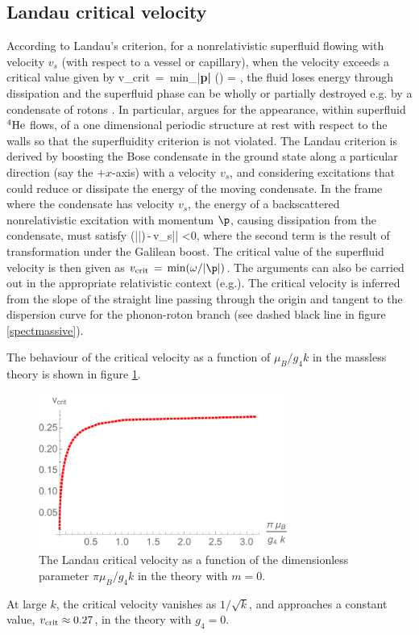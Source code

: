 \subsection{Landau critical velocity}
According to Landau's criterion, for a nonrelativistic superfluid flowing with velocity $v_s$ (with respect to a vessel or capillary), when the velocity exceeds a critical value \cite{schmitt} given by 
\be
v_{\rm crit} \,=\, {\rm min}_{|\bf p|} \left(\frac{\omega(\p)}{|\p|}\right)\,\implies \frac{\partial \omega}{\partial |\p|}\,=\,\frac{\omega}{|\p|}\,,
\ee
the fluid loses energy through dissipation and the superfluid phase can be wholly or partially destroyed e.g. by a condensate of rotons \cite{pitaevskii84, voskresenskii93}. In particular, \cite{pitaevskii84} argues for the appearance, within superfluid ${}^4{\rm He}$ flows, of a one dimensional periodic structure at rest with  respect to the walls so that the superfluidity criterion is not violated. The Landau criterion is derived by boosting the Bose condensate in the ground state along a particular direction (say the $+x$-axis) with a velocity $v_s$, and considering excitations that could reduce or dissipate the energy of the moving condensate. In the frame where the condensate has velocity $v_s$, the energy of a backscattered nonrelativistic excitation with momentum $\p$, causing dissipation  from the condensate, must  satisfy
\be
\omega(|\p|)\,-\,v_s|\p| <0,
\ee
where the second term is the result of  transformation under  the Galilean boost.
The critical value of the superfluid velocity is then given as $v_{\rm crit}\,=\,{\rm min}(\omega/|\p|)$. The arguments can also be carried out in the appropriate relativistic context (e.g.\cite{voskresenskii93, schmitt}). The critical velocity is inferred from the slope of the straight line passing through the origin and tangent to the dispersion curve for the phonon-roton branch (see dashed black line in figure \ref{spectmassive}).

 The behaviour of the critical velocity as a function of $\mu_B/g_4 k$ in the massless theory is shown in figure \ref{vcrit}.
 \begin{figure}[h]
\begin{center}
\includegraphics[height=2.0in]{Chapter_3_Folder_1806.06976/figures/vcrit.pdf}
\end{center}
\caption{ \small{The Landau critical velocity as a function of the dimensionless parameter $\pi\mu_B/g_4 k$ in the theory with $m=0$.}}
\label{vcrit}
\end{figure}
 At large $k$, the critical velocity vanishes as $1/\sqrt{k}$, and approaches a constant value, $v_{\rm crit}\approx 0.27$, in the theory with $g_4=0$.
